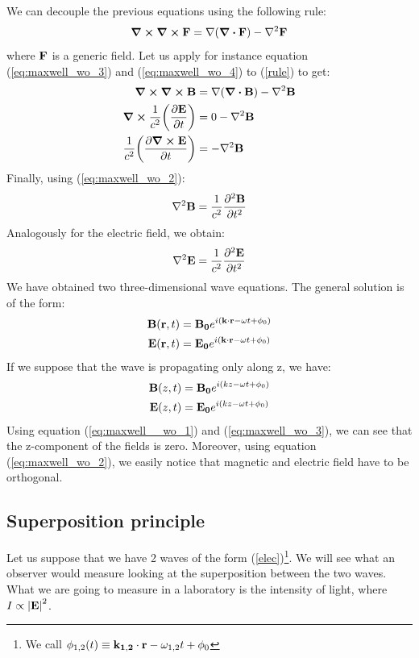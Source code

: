 \documentclass[11pt,a4paper]{article}
\begin{document}
We can decouple the previous equations using the following rule:
\begin{equation}
\curl \curl \vb{F}=\nabla (\div \vb{F})- \nabla^2\vb{F}\label{rule}
\end{equation}
where $\vb{F}$ is a generic field. Let us apply for instance equation (\ref{eq:maxwell_wo_3}) and (\ref{eq:maxwell_wo_4}) to (\ref{rule}) to get:
\begin{align*}
\curl \curl \vb{B} &=\nabla (\div \vb{B})- \nabla^2\vb{B} \\
\curl \frac{1}{c^2}\qty(\pdv{\vb{E}}{t}) &=0-\nabla^2\vb{B} \\
\frac{1}{c^2}\qty(\pdv{\curl \vb{E}}{t}) &=-\nabla^2\vb{B}
\end{align*}
Finally, using (\ref{eq:maxwell_wo_2}):
\begin{equation}
\nabla^2\vb{B}=\frac{1}{c^2}\pdv{^2 \vb{B}}{t^2}
\end{equation}
Analogously for the electric field, we obtain:
\begin{equation}
\nabla^2\vb{E}=\frac{1}{c^2}\pdv{^2 \vb{E}}{t^2}
\end{equation}
We have obtained two three-dimensional wave equations. The general solution is of the form:
\begin{align}
\vb{B}(\vb{r},t) &=\vb{B_0}e^{i(\vb{k} \cdot \vb{r}-\omega t+\phi_0)}\\
\vb{E}(\vb{r},t) &=\vb{E_0}e^{i(\vb{k} \cdot \vb{r}-\omega t+\phi_0)}\label{elec}
\end{align}
If we suppose that the wave is propagating only along z, we have:
\begin{align}
\vb{B}(z,t) &=\vb{B_0}e^{i(kz-\omega t+\phi_0)}\\
\vb{E}(z,t) &=\vb{E_0}e^{i(kz-\omega t+\phi_0)}
\end{align}
Using equation (\ref{eq:maxwell__wo_1}) and (\ref{eq:maxwell_wo_3}), we can see that the z-component of the fields is zero. Moreover, using equation (\ref{eq:maxwell_wo_2}), we easily notice that magnetic and electric field have to be orthogonal.

\subsection{Superposition principle}

Let us suppose that we have 2 waves of the form (\ref{elec})\footnote{We call $\phi_{1,2}(t)\equiv\vb{k_{1,2}} \cdot \vb{r}-\omega_{1,2} t+\phi_0$}. We will see what an observer would measure looking at the superposition between the two waves. What we are going to measure in a laboratory is the intensity of light, where $I\propto \abs{\vb{E}}^2$.
\end{document}
